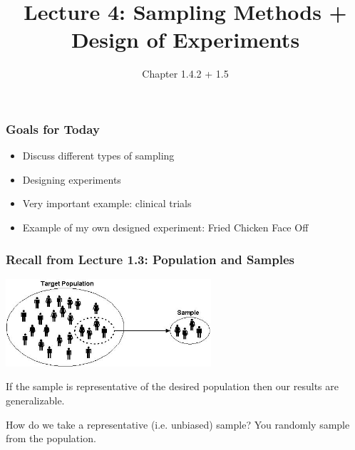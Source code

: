 \documentclass[slides]{beamer}
\title{Lecture 4: Sampling Methods + Design of Experiments}
\author{Chapter 1.4.2 + 1.5}
\date{}
\newcommand{\blue}[1]{\textcolor{blue2}{#1}}
\begin{document}
\begin{frame}
\titlepage
\end{frame}


\begin{frame}
\frametitle{Goals for Today}

\begin{itemize}
\item Discuss different types of sampling
\item Designing experiments
\item Very important example:  clinical trials
\item Example of my own designed experiment: Fried Chicken Face Off
\end{itemize}

\end{frame}


\begin{frame}
\frametitle{Recall from Lecture 1.3: Population and Samples}

\begin{center}
\includegraphics[width=3in]{figure/target-population.jpg} 
\end{center}


\pause If the sample is representative of the desired population then our results are \blue{generalizable}.  

\vskip 0.5cm

\pause How do we take a representative (i.e. unbiased) sample?  You \blue{randomly} sample from the population.

\end{frame}
\end{document}

